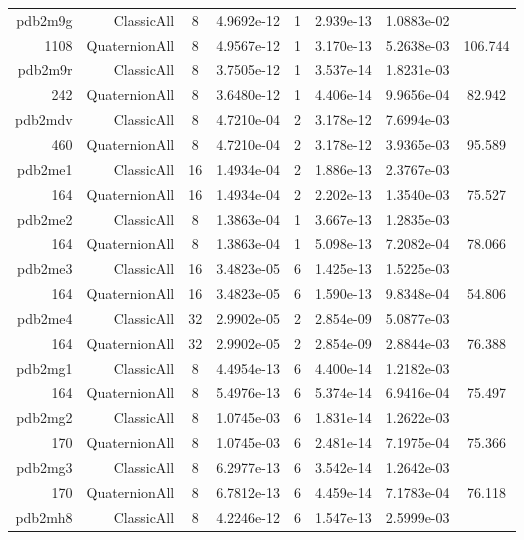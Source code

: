 \begin{xltabular}{\textwidth}{r|rcS[table-format=1.4e+2]cS[table-format=1.3e+2]S[table-format=1.4e+2]S[table-format=-1.3]}
pdb2m9g & ClassicAll & 8 & 4.9692e-12 & 1 & 2.939e-13 & 1.0883e-02 & \\
1108 & QuaternionAll & 8 & 4.9567e-12 & 1 & 3.170e-13 & 5.2638e-03 & 106.744\\  \addlinespace
pdb2m9r & ClassicAll & 8 & 3.7505e-12 & 1 & 3.537e-14 & 1.8231e-03 & \\
242 & QuaternionAll & 8 & 3.6480e-12 & 1 & 4.406e-14 & 9.9656e-04 & 82.942\\  \addlinespace
pdb2mdv & ClassicAll & 8 & 4.7210e-04 & 2 & 3.178e-12 & 7.6994e-03 & \\
460 & QuaternionAll & 8 & 4.7210e-04 & 2 & 3.178e-12 & 3.9365e-03 & 95.589\\  \addlinespace
pdb2me1 & ClassicAll & 16 & 1.4934e-04 & 2 & 1.886e-13 & 2.3767e-03 & \\
164 & QuaternionAll & 16 & 1.4934e-04 & 2 & 2.202e-13 & 1.3540e-03 & 75.527\\  \addlinespace
pdb2me2 & ClassicAll & 8 & 1.3863e-04 & 1 & 3.667e-13 & 1.2835e-03 & \\
164 & QuaternionAll & 8 & 1.3863e-04 & 1 & 5.098e-13 & 7.2082e-04 & 78.066\\  \addlinespace
pdb2me3 & ClassicAll & 16 & 3.4823e-05 & 6 & 1.425e-13 & 1.5225e-03 & \\
164 & QuaternionAll & 16 & 3.4823e-05 & 6 & 1.590e-13 & 9.8348e-04 & 54.806\\  \addlinespace
pdb2me4 & ClassicAll & 32 & 2.9902e-05 & 2 & 2.854e-09 & 5.0877e-03 & \\
164 & QuaternionAll & 32 & 2.9902e-05 & 2 & 2.854e-09 & 2.8844e-03 & 76.388\\  \addlinespace
pdb2mg1 & ClassicAll & 8 & 4.4954e-13 & 6 & 4.400e-14 & 1.2182e-03 & \\
164 & QuaternionAll & 8 & 5.4976e-13 & 6 & 5.374e-14 & 6.9416e-04 & 75.497\\  \addlinespace
pdb2mg2 & ClassicAll & 8 & 1.0745e-03 & 6 & 1.831e-14 & 1.2622e-03 & \\
170 & QuaternionAll & 8 & 1.0745e-03 & 6 & 2.481e-14 & 7.1975e-04 & 75.366\\  \addlinespace
pdb2mg3 & ClassicAll & 8 & 6.2977e-13 & 6 & 3.542e-14 & 1.2642e-03 & \\
170 & QuaternionAll & 8 & 6.7812e-13 & 6 & 4.459e-14 & 7.1783e-04 & 76.118\\  \addlinespace
pdb2mh8 & ClassicAll & 8 & 4.2246e-12 & 6 & 1.547e-13 & 2.5999e-03 & \\

\end{xltabular}
